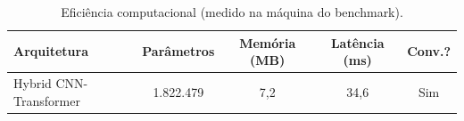 \begin{table}[H]
\centering
\caption{Eficiência computacional (medido na máquina do benchmark).}
\label{tab:bench_eficiencia}
\small\singlespacing
\begin{tabular}{lcccc}
\toprule
\textbf{Arquitetura} & \textbf{Parâmetros} & \textbf{Memória (MB)} & \textbf{Latência (ms)} & \textbf{Conv.?} \\
\midrule
Hybrid CNN-Transformer & 1.822.479 & 7,2 & 34,6 & \textcolor{successgreen}{Sim} \\
\bottomrule
\end{tabular}
\end{table}
